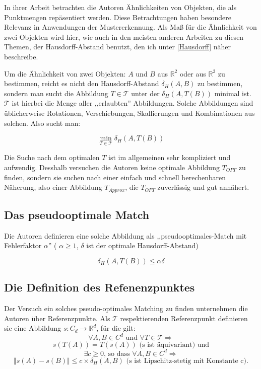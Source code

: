 In ihrer Arbeit betrachten die Autoren Ähnlichkeiten von Objekten, die als Punktmengen repäsentiert werden. Diese Betrachtungen haben besondere Relevanz in Anwendungen der Mustererkennung. Als Maß für die Ähnlichkeit von zwei Objekten wird hier, wie auch in den meisten anderen Arbeiten zu diesen Themen, der Hausdorff-Abstand benutzt, den ich unter \ref{Hausdorff} näher beschreibe.

Um die Ähnlichkeit von zwei Objekten: $A$ und $B$ aus $\mathbb{R}^2$ oder aus $\mathbb{R}^3$ zu bestimmen, reicht es nicht den Hausdorff-Abstand $\delta_H(A,B)$ zu bestimmen, sondern man sucht die Abbildung $T\in\mathcal{T}$ unter der $\delta_H(A,T(B))$ minimal ist. $\mathcal{T}$ ist hierbei die Menge aller ,,erlaubten'' Abbildungen. Solche Abbildungen sind üblicherweise Rotationen, Verschiebungen, Skallierungen und Kombinationen aus solchen. Also sucht man:

$$\min_{T\in\mathcal{T}}\delta_H(A,T(B))$$

Die Suche nach dem optimalen $T$ ist im allgemeinen sehr kompliziert und aufwendig. Desshalb versuchen die Autoren keine optimale Abbildung $T_{OPT}$ zu finden, sondern sie suchen nach einer einfach und schnell berechenbaren Näherung, also einer Abbildung $T_{Approx}$, die $T_{OPT}$ zuverlässig und gut annähert.

\subsection{Das pseudooptimale Match}

Die Autoren definieren eine solche Abbildung als ,,pseudooptimales-Match mit Fehlerfaktor $\alpha$'' ( $\alpha\geq 1$, $\delta$ ist der optimale Hausdorff-Abstand)

$$\delta_H(A,T(B))\leq \alpha \delta$$

\subsection{Die Definition des Refenenzpunktes}

Der Versuch ein solches pseudo-optimales Matching zu finden unternehmen die Autoren über Referenzpunkte. Als $\mathcal{T}$ respektierenden Referenzpunkt definieren sie eine Abbildung $s:C_d\longrightarrow\mathbb{R}^d$, für die gilt:
$$\forall A, B\in C^d \text{ und } \forall T\in\mathcal{T}\Rightarrow$$
$$s(T(A))=T(s(A))\text{ (s ist äquivariant) und}$$
$$\exists c\geq0 \text{, so dass } \forall A, B \in C^d\Rightarrow$$
$$\Vert s(A)-s(B)\Vert\leq c\times\delta_H(A,B)\text{ (s ist Lipschitz-stetig mit Konstante c)}.$$

